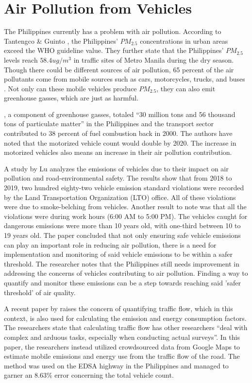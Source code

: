 \section{Air Pollution from Vehicles}
The Philippines currently has a problem with air pollution. According to Tantengco \& Guinto \citeyear{TANTENGCO2022}, the Philippines’ $PM_{2.5}$ concentrations in urban areas exceed the WHO guideline value. They further state that the Philippines’ $PM_{2.5}$ levels reach $58.4 ug/m^{3}$ in traffic sites of Metro Manila during the dry season. Though there could be different sources of air pollution, 65 percent of the air pollutants come from mobile sources such as cars, motorcycles, trucks, and buses \cite{EMB_2015}. Not only can these mobile vehicles produce $PM_{2.5}$, they can also emit greenhouse gasses, which are just as harmful.

	, a component of greenhouse gasses, totaled “30 million tons and 56 thousand tons of particulate matter” \cite{FabianGota2009} in the Philippines and the transport sector contributed to 38 percent of fuel combustion back in 2000. The authors have noted that the motorized vehicle count would double by 2020. The increase in motorized vehicles also means an increase in their air pollution contribution. 

A study by Lu \citeyear{lu_2022} analyzes the emissions of vehicles due to their impact on air pollution and road-environmental safety. The results show that from 2018 to 2019, two hundred eighty-two vehicle emission standard violations were recorded by the Land Transportation Organization (LTO) office. All of these violations were due to smoke-belching from vehicles. Another result to note was that all the violations were during work hours (6:00 AM to 5:00 PM). The vehicles caught for dangerous emissions were more than 10 years old, with one-third between 10 to 19 years old. The paper concluded that not only ensuring safe vehicle emissions can play an important role in reducing air pollution, there is a need for implementation and monitoring of said vehicle emissions to be within a safer threshold. The researcher notes that the Philippines still needs improvement in addressing the concerns of vehicles contributing to air pollution. Finding a way to quantify and monitor these emissions can be a step towards reaching said 'safer threshold' of air quality.

A recent paper by  raises the concern of quantifying traffic flow, which in this context, is also used for calculating the emission and energy consumption factors. The researchers state that calculating traffic flow has other researchers “deal with complex and arduous tasks, especially when conducting actual surveys”. In this paper, the researchers instead utilized crowdsourced data from Google Maps to estimate mobile emissions and energy use from the traffic flow of the road. The method was used on the EDSA highway in the Philippines and managed to garner an 8.63\% error concerning the total vehicle count.


